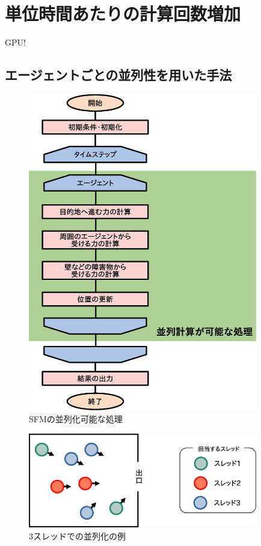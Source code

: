 \section{単位時間あたりの計算回数増加}

GPU!\cite{seru_sfm1}\cite{seru_sfm2}

\subsection{エージェントごとの並列性を用いた手法}

\begin{figure}[hp]
 \begin{center}
  \includegraphics[width=10cm,clip]{figure/heiretuka_sfm.eps}
  \caption{SFMの並列化可能な処理}
  \label{fig:atigenshou}
 \end{center}
\end{figure}

\begin{figure}[hp]
 \begin{center}
  \includegraphics[width=10cm,clip]{figure/sureddo_heiretu.eps}
  \caption{3スレッドでの並列化の例}
  \label{fig:atigenshou}
 \end{center}
\end{figure}



